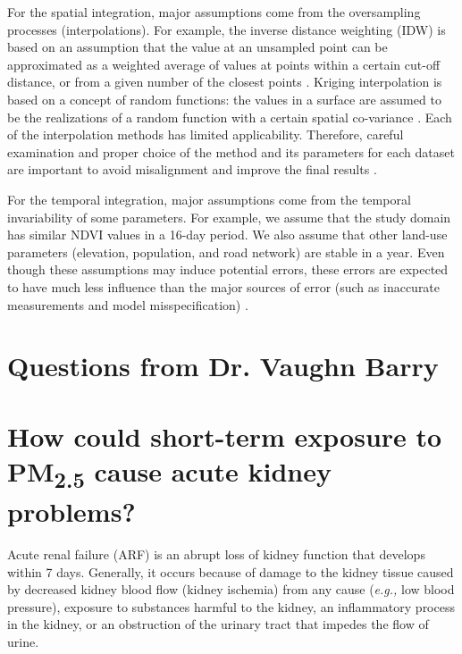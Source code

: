 \documentclass[11pt]{article}
\newcommand{\tsub}{\textsubscript}
\begin{document}
\begin{enumerate*}[{[a)]}]
{    \item For the spatial integration, major assumptions come from the oversampling processes (interpolations). For example, the inverse distance weighting (IDW) is based on an assumption that the value at an unsampled point can be approximated as a weighted average of values at points within a certain cut-off distance, or from a given number of the closest points \citep{bartier1996multivariate}. Kriging interpolation is based on a concept of random functions: the values in a surface are assumed to be the realizations of a random function with a certain spatial co-variance \citep{oliver1990kriging}. Each of the interpolation methods has limited applicability. Therefore, careful examination and proper choice of the method and its parameters for each dataset are important to avoid misalignment and improve the final results \citep{mitas1999spatial}.
    
    For the temporal integration, major assumptions come from the temporal invariability of some parameters. For example, we assume that the study domain has similar NDVI values in a 16-day period. We also assume that other land-use parameters (elevation, population, and road network) are stable in a year. Even though these assumptions may induce potential errors, these errors are expected to have much less influence than the major sources of error (such as inaccurate measurements and model misspecification) \citep{xiao2017full}.
    }
\end{enumerate*}



\hdashrule{\textwidth}{0.1pt}{0.6mm 0.6mm}
\setcounter{section}{0}

\section*{Questions from Dr. Vaughn Barry}

\section{How could short-term exposure to \texorpdfstring{PM\tsub{2.5}}{PM2.5} cause acute kidney problems?}
Acute renal failure (ARF) is an abrupt loss of kidney function that develops within 7 days. Generally, it occurs because of damage to the kidney tissue caused by decreased kidney blood flow (kidney ischemia) from any cause (\textit{e.g.,} low blood pressure), exposure to substances harmful to the kidney, an inflammatory process in the kidney, or an obstruction of the urinary tract that impedes the flow of urine. 
\end{document}
